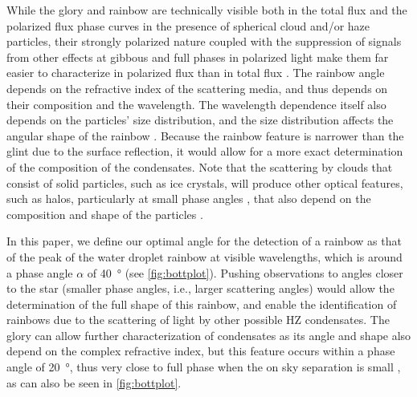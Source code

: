 \documentclass[usenatbib]{mnras}
\begin{document}
%
While the glory and rainbow are technically visible both in the total flux
and the polarized flux phase curves in the presence of spherical cloud and/or haze particles, their strongly polarized nature coupled with the suppression of signals from other effects at gibbous and full phases in polarized light make them far easier to characterize in polarized flux than in total flux \citep{karalidi2011, stam2008, treesandstam2019}.
%
The rainbow angle depends on the refractive index of the scattering media, and thus depends on their composition and the wavelength. 
%
The wavelength dependence itself also depends on the particles' size distribution, and the size distribution affects the angular shape of the rainbow \citep{karalidi2011}.
%
Because the rainbow feature is narrower than the glint due to the surface reflection, it would allow for a more exact determination of the composition of the condensates.
%
Note that the scattering by clouds that consist of solid particles, such as ice crystals, will produce other optical features, such as halos, particularly at small phase angles \citep{2022JQSRT.29008313M,Bailey2007,hansentravis1974, karalidi2012rainbow}, that also depend on the composition and shape of the particles \citep[see, e.g.,][for simulations of halos due to carbon dioxide ice crystals]{2023GeoRL..5003457D}.

In this paper, we define our optimal angle for the detection of a rainbow as that of the peak of the water droplet rainbow at visible wavelengths, which is around a phase angle $\alpha$ of \qty{40}{\degree} (see \cref{fig:bottplot}).
%
Pushing observations to angles closer to the star (smaller phase angles, i.e., larger scattering angles) would allow the determination of the full shape of this rainbow, and enable the identification of rainbows due to the scattering of light by other possible HZ condensates.
%
The glory can allow further characterization of condensates as its angle and shape also depend on the complex refractive index, but this feature occurs within a phase angle of \qty{20}{\degree}, thus very close to full phase when the on sky separation is small \citep{hansentravis1974}, as can also be seen in \cref{fig:bottplot}.


%
\end{document}
